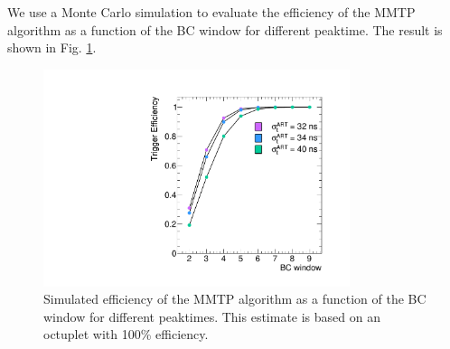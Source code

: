  We use a Monte Carlo simulation to evaluate the efficiency of the MMTP algorithm as a function of the BC window
 for different peaktime. The result is shown in Fig. \ref{fig:peakeff}.
\begin{figure}[!htpb]
  \begin{center}
    \includegraphics[width=0.8\textwidth]{figures/trigeffs.pdf}
\end{center}
  \vspace{-10pt}
  \caption{ Simulated efficiency of the MMTP algorithm as a function of the BC window for different peaktimes.
 This estimate is based on an octuplet with 100\% efficiency.}
  \label{fig:peakeff}
\end{figure}

